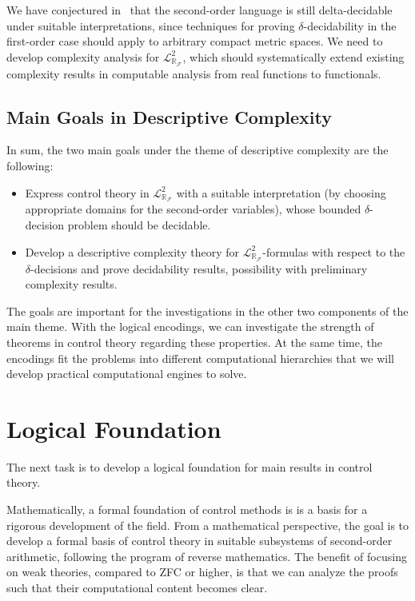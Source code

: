 \documentclass[10pt]{article}
\newcommand{\lrf}{\mathcal{L}_{\mathbb{R}_{\mathcal{F}}}}
\theoremstyle{definition}
\begin{document}
We have conjectured in~\cite{DBLP:conf/lics/GaoAC12} that the second-order language is still delta-decidable under suitable interpretations, since techniques for proving $\delta$-decidability in the first-order case should apply to arbitrary compact metric spaces. We need to develop complexity analysis for $\lrf^2$, which should systematically extend existing complexity results in computable analysis from real functions to functionals. 

\subsection{Main Goals in Descriptive Complexity} 
In sum, the two main goals under the theme of descriptive complexity are the following:
\begin{itemize}
\item Express control theory in $\mathcal{L}^2_{\mathbb{R}_{\mathcal{F}}}$ with a suitable interpretation (by choosing appropriate domains for the second-order variables), whose bounded $\delta$-decision problem should be decidable.
\item Develop a descriptive complexity theory for $\lrf^2$-formulas with respect to the $\delta$-decisions and prove decidability results, possibility with preliminary complexity results. 
\end{itemize}
The goals are important for the investigations in the other two components of the main theme. With the logical encodings, we can investigate the strength of theorems in control theory regarding these properties. At the same time, the encodings fit the problems into different computational hierarchies that we will develop practical computational engines to solve. 

\section{Logical Foundation}\label{lf}

The next task is to develop a logical foundation for main results in control theory.

Mathematically, a formal foundation of control methods is is a basis for a rigorous development of the field. From a mathematical perspective, the goal is to develop a formal basis of control theory in suitable subsystems of second-order arithmetic, following the program of reverse mathematics. The benefit of focusing on weak theories, compared to ZFC or higher, is that we can analyze the proofs such that their computational content becomes clear. 
\end{document}
